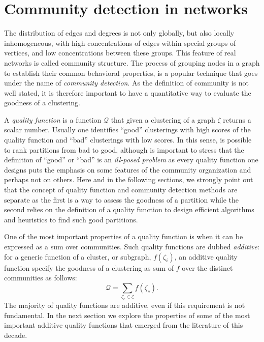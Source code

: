 \section{Community detection in networks}
\label{sec:communitydetectioninnetworks}
The distribution of edges and degrees is not only globally, but also locally inhomogeneous, with high concentrations of edges within special groups of vertices, and low concentrations between these groups. This feature of real networks is called community structure. 
The process of grouping nodes in a graph to establish their common behavioral properties, is a popular technique that goes under the name of \emph{community detection}.
As the definition of community is not well stated, it is therefore important to have a quantitative way to evaluate the goodness of a clustering.

A \emph{quality function} is a function $\mathcal{Q}$ that given a clustering of a graph $\zeta$ returns a scalar number. Usually one identifies ``good'' clusterings with high scores of the quality function and ``bad'' clusterings with low scores. In this sense, is possible to rank partitions from bad to good, although is important to stress that the definition of ``good'' or ``bad'' is an \emph{ill-posed problem} as every quality function one designs puts the emphasis on some features of the community organization and perhaps not on others.
Here and in the following sections, we strongly point out that the concept of quality function and community detection methods are separate as the first is a way to assess the goodness of a partition while the second relies on the definition of a quality function to design efficient algorithms and heuristics to find such good partitions.

One of the most important properties of a quality function is when it can be expressed as a sum over communities. Such quality functions are dubbed \emph{additive}: for a generic function of a cluster, or subgraph, $f(\zeta_i)$, an additive quality function specify the goodness of a clustering as sum of $f$ over the distinct communities as follows:
\begin{equation}\label{eq:additive_quality}
\mathcal{Q} = \sum \limits_{\zeta_c \in \zeta} f(\zeta_c).
\end{equation}
The majority of quality functions are additive, even if this requirement is not fundamental. In the next section we explore the properties of some of the most important additive quality functions that emerged from the literature of this decade.

